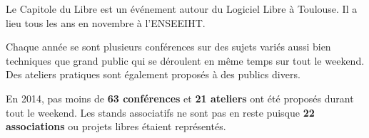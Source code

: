 
Le Capitole du Libre est un événement autour du Logiciel Libre à Toulouse. Il a lieu tous les ans en novembre à l'ENSEEIHT.

Chaque année se sont plusieurs conférences sur des sujets variés aussi bien techniques que grand public qui se déroulent en même temps sur tout le weekend. Des ateliers pratiques sont également proposés à des publics divers.

En 2014, pas moins de \textbf{63 conférences} et \textbf{21 ateliers} ont été proposés durant tout le weekend. Les stands associatifs ne sont pas en reste puisque \textbf{22 associations} ou projets libres étaient représentés.
